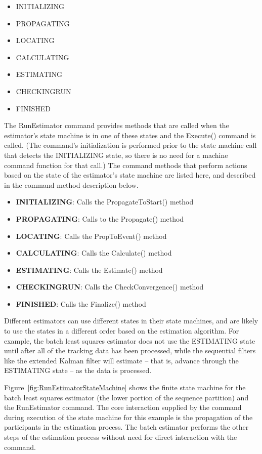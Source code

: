 \begin{itemize}
\item INITIALIZING
\item PROPAGATING
\item LOCATING
\item CALCULATING
\item ESTIMATING
\item CHECKINGRUN
\item FINISHED
\end{itemize}

The RunEstimator command provides methods that are called when the estimator's state machine is in one of these states and the Execute() command is called.  (The command's initialization is performed prior to the state machine call that detects the INITIALIZING state, so there is no need for a machine command function for that call.)  The command methods that perform actions based on the state of the estimator's state machine are listed here, and described in the command method description below.

\begin{itemize}
\item \textbf{INITIALIZING}:  Calls the PropagateToStart() method
\item \textbf{PROPAGATING}:  Calls to the Propagate() method
\item \textbf{LOCATING}:  Calls the PropToEvent() method
\item \textbf{CALCULATING}:  Calls the Calculate() method
\item \textbf{ESTIMATING}:  Calls the Estimate() method
\item \textbf{CHECKINGRUN}:  Calls the CheckConvergence() method
\item \textbf{FINISHED}:  Calls the Finalize() method
\end{itemize}

Different estimators can use different states in their state machines, and are likely to use the states in a different order based on the estimation algorithm.  For example, the batch least squares estimator does not use the ESTIMATING state until after all of the tracking data has been processed, while the sequential filters like the extended Kalman filter will estimate -- that is, advance through the ESTIMATING state -- as the data is processed.

Figure~\ref{fig:RunEstimatorStateMachine} shows the finite state machine for the batch least squares estimator (the lower portion of the sequence partition) and the RunEstimator command.  The core interaction supplied by the command during execution of the state machine for this example is the propagation of the participants in the estimation process.  The batch estimator performs the other steps of the estimation process without need for direct interaction with the command.

